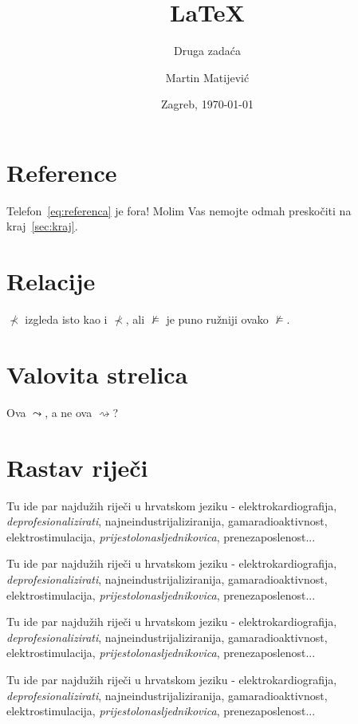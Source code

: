 \documentclass[10pt]{scrartcl}
\begin{document}
\title{\Huge\LaTeX}
\subtitle{Druga zadaća}
\author{Martin Matijević}
\date{Zagreb, \today}
\maketitle
\tableofcontents

\section{Reference}
Telefon~\eqref{eq:referenca} je fora! Molim Vas nemojte odmah preskočiti na kraj~\ref{sec:kraj}.

\section{Relacije}
$\not\prec$ izgleda isto kao i $\nprec$, ali $\nvDash$ je puno ružniji ovako $\not\vDash$.

\section{Valovita strelica}
Ova $\leadsto$, a ne ova $\rightsquigarrow$?

\section{Rastav riječi}
Tu ide par najdužih riječi u hrvatskom jeziku - elektrokardiografija, \textit{deprofesionalizirati}, najneindustrijaliziranija, gamaradioaktivnost, elektrostimulacija, \textit{prijestolonasljednikovica}, prenezaposlenost...
\par\noindent
Tu ide par najdužih riječi u hrvatskom jeziku - elektrokardiografija, \textit{dep\-ro\-fe\-si\-o\-na\-li\-zi\-ra\-ti}, najneindustrijaliziranija, gamaradioaktivnost, elektrostimulacija, \textit{prijes\-to\-lo\-nas\-ljed\-ni\-ko\-vi\-ca}, prenezaposlenost...
\par\noindent
Tu ide par najdužih riječi u hrvatskom jeziku - elektrokardiografija, \textit{dep\-ro\-fe\-si\-o\-na\-li\-zi\-ra\-ti}, najneindustrijaliziranija, gamaradioaktivnost, elektrostimulacija, \textit{prijestolonasljednikovica}, prenezaposlenost...
\par\noindent
Tu ide par najdužih riječi u hrvatskom jeziku - elektrokardiografija, \textit{deprofesionalizirati}, najneindustrijaliziranija, gamaradioaktivnost, elektrostimulacija, \textit{prijes\-to\-lo\-nas\-ljed\-ni\-ko\-vi\-ca}, prenezaposlenost...
\end{document}
